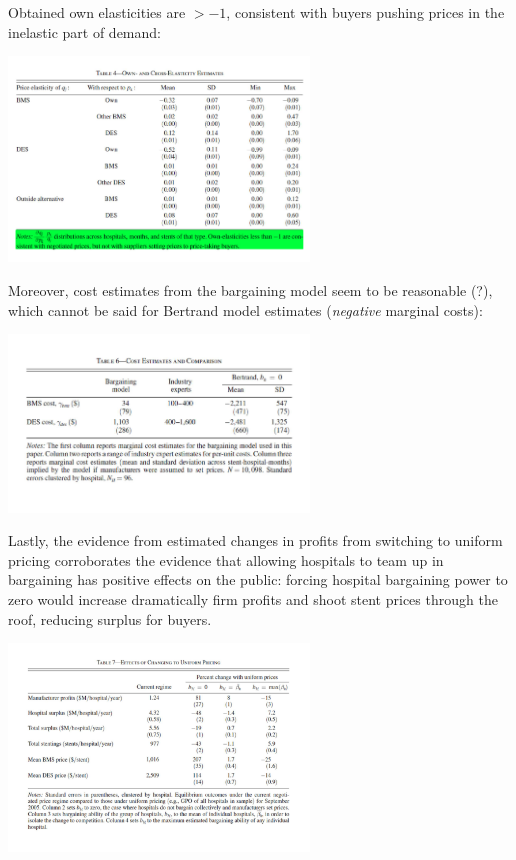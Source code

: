 \documentclass[11pt]{article}
\numberwithin{equation}{section}
\begin{document}
Obtained own elasticities are $>-1$, consistent with buyers pushing prices in the inelastic part of demand:
\begin{center}
	\includegraphics[width = 0.6\textwidth]{l3p2}
\end{center}
Moreover, cost estimates from the bargaining model seem to be reasonable (?), which cannot be said for Bertrand model estimates (\textit{negative} marginal costs):
\begin{center}
	\includegraphics[width = 0.6\textwidth]{l3p3}
\end{center}
Lastly, the evidence from estimated changes in profits from switching to uniform pricing corroborates the evidence that allowing hospitals to team up in bargaining has positive effects on the public: forcing hospital bargaining power to zero would increase dramatically firm profits and shoot stent prices through the roof, reducing surplus for buyers.
\begin{center}
	\includegraphics[width = 0.6\textwidth]{l3p4}
\end{center}
\end{document}

